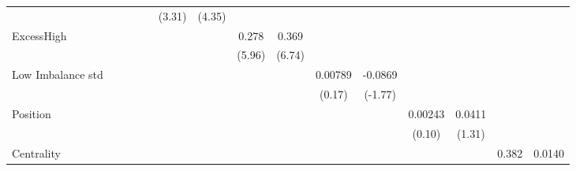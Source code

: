 {\begin{tabular}{l*{14}{c}}
                &                  &                  &                  &                  &   (3.31)         &   (4.35)         &                  &                  &                  &                  &                  &                  &                  &                  \\
[1em]
ExcessHigh      &                  &                  &                  &                  &                  &                  &    0.278\sym{***}&    0.369\sym{***}&                  &                  &                  &                  &                  &                  \\
                &                  &                  &                  &                  &                  &                  &   (5.96)         &   (6.74)         &                  &                  &                  &                  &                  &                  \\
[1em]
Low Imbalance std&                  &                  &                  &                  &                  &                  &                  &                  &  0.00789         &  -0.0869         &                  &                  &                  &                  \\
                &                  &                  &                  &                  &                  &                  &                  &                  &   (0.17)         &  (-1.77)         &                  &                  &                  &                  \\
[1em]
Position        &                  &                  &                  &                  &                  &                  &                  &                  &                  &                  &  0.00243         &   0.0411         &                  &                  \\
                &                  &                  &                  &                  &                  &                  &                  &                  &                  &                  &   (0.10)         &   (1.31)         &                  &                  \\
[1em]
Centrality      &                  &                  &                  &                  &                  &                  &                  &                  &                  &                  &                  &                  &    0.382\sym{*}  &   0.0140         \\

\end{tabular}}
